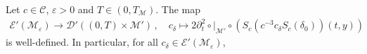 \documentclass[
	fontsize=11pt, 
	twoside=false, 
	abstract=true, 
	a4paper,
]{scrartcl}
\newcommand{\eps}{\varepsilon}
\newcommand{\sem}{\setminus\{0\}}
\newcommand{\RR}{\mathbb{R}}
\newcommand{\DD}{\mathscr{D}}
\newcommand{\del}{\partial}
\newcommand{\supp}{\mathrm{supp}}
\newcommand{\an}{\quad\text{and}\quad}
\newcommand{\wf}{\mathrm{WF}_{\mathrm{a}}}
\begin{document}
\begin{corollary}\label{cor:welldefDA}
	Let $c\in\mathcal{C}$, $\eps>0$ and $T \in (0,T_{\mathcal{M}})$. 
	The map
	\begin{align}
		\mathcal{E}'(\mathcal{M}_\eps) \to \mathcal{D}'((0,T)\times\mathcal{M}')\,,\quad c_\delta \mapsto 2\del_t^2\circ \vert_{\mathcal{M}'} \circ \left(S_{c}(c^{-3}c_\delta S_{c}(\delta_0))(t,y)\right) %
		\label{eq:tgreater02}
	\end{align}
	is well-defined. In particular, for all $c_\delta \in \mathcal{E}'(\mathcal{M}_\eps)$,

\end{corollary}
\end{document}
